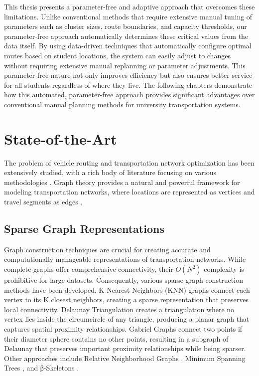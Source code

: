 This thesis presents a parameter-free and adaptive approach that overcomes these limitations. Unlike conventional methods that require extensive manual tuning of parameters such as cluster sizes, route boundaries, and capacity thresholds, our parameter-free approach automatically determines these critical values from the data itself. By using data-driven techniques that automatically configure optimal routes based on student locations, the system can easily adjust to changes without requiring extensive manual replanning or parameter adjustments. This parameter-free nature not only improves efficiency but also ensures better service for all students regardless of where they live. The following chapters demonstrate how this automated, parameter-free approach provides significant advantages over conventional manual planning methods for university transportation systems.

\section{State-of-the-Art}
\label{sec:intro_sota}
The problem of vehicle routing and transportation network optimization has been extensively studied, with a rich body of literature focusing on various methodologies \cite{toth2014vehicle}. Graph theory provides a natural and powerful framework for modeling transportation networks, where locations are represented as vertices and travel segments as edges \cite{tarapata2019graph}.

\subsection{Sparse Graph Representations}
Graph construction techniques are crucial for creating accurate and computationally manageable representations of transportation networks. While complete graphs offer comprehensive connectivity, their $O(N^2)$ complexity is prohibitive for large datasets. Consequently, various sparse graph construction methods have been developed. K-Nearest Neighbors (KNN) graphs \cite{dong2011efficient} connect each vertex to its K closest neighbors, creating a sparse representation that preserves local connectivity. Delaunay Triangulation \cite{lee1980two} creates a triangulation where no vertex lies inside the circumcircle of any triangle, producing a planar graph that captures spatial proximity relationships. Gabriel Graphs \cite{gabriel1969new} connect two points if their diameter sphere contains no other points, resulting in a subgraph of Delaunay that preserves important proximity relationships while being sparser. Other approaches include Relative Neighborhood Graphs \cite{toussaint1980relative}, Minimum Spanning Trees \cite{graham1985euclidean}, and β-Skeletons \cite{kirkpatrick1985framework}.

